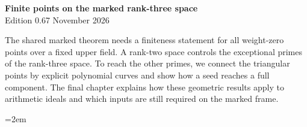 \begin{center}
{\Large\bfseries Finite points on the marked rank-three space}\\[4pt]
Edition 0.67  November 2026
\end{center}

The shared marked theorem needs a finiteness statement for all
weight-zero points over a fixed upper field. A rank-two space
controls the exceptional primes of the rank-three space. To reach
the other primes, we connect the triangular points by explicit
polynomial curves and show how a seed reaches a full component.
The final chapter explains how these geometric results apply to
arithmetic ideals and which inputs are still required on the marked
frame.

\begingroup\emergencystretch=2em




\endgroup
